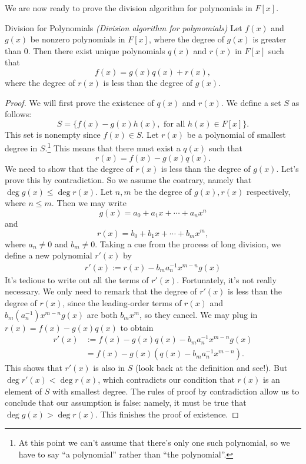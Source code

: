 We are now ready to prove the division algorithm for polynomials in $F[x]$.

\begin{prop} {Division for Polynomials} \emph{(Division algorithm for polynomials)}
Let $f(x)$ and $g(x)$ be nonzero polynomials in $F[x]$, where the degree of $g(x)$ is greater than 0.  Then there exist unique polynomials $q(x)$ and $r(x)$ in $F[x]$ such that 
\[
f(x) = g(x)q(x) + r(x),
\]
where the degree of $r(x)$ is less than the degree of $g(x)$.
\end {prop}

\begin{proof}
We will first prove the existence of $q(x)$ and $r(x)$. We define a set $S$ as follows: 
\[S = \{f(x) - g(x) h(x), \text{ for all } h(x) \in F[x] \}.\] 
 This set is nonempty since $f(x) \in
S$. 
Let
$r(x)$ be  a polynomial of smallest degree in $S$.\footnote{At this point we can't assume that there's only one such polynomial, so we have to say ``a polynomial'' rather than ``the polynomial''.} This means that there must exist a $q(x)$ such that  
\[
r(x) = f(x) - g(x) q(x).
\]
We need to show that the degree of $r(x)$ is less than the degree of
$g(x)$. Let's prove this by contradiction. So we assume the contrary, namely  that $\deg g(x) \leq \deg r(x)$. 
Let $n,m$ be the degree of $g(x),r(x)$ respectively, where $n \leq m$. Then we may write
\[
g(x) = a_0 + a_1 x + \cdots + a_n x^n
\]
and
\[
r(x) = b_0 + b_1 
x + \cdots + b_m x^m, \]
where $a_n \neq 0$ and $b_m \neq 0$. 
Taking a cue from the process of long division, we define a new polynomial $r'(x)$ by
\begin{align*}
r'(x) := r(x) - b_m a_n^{-1} x^{m-n}g(x)
\end{align*}
It's tedious to write out all the terms of $r'(x)$. Fortunately, it's not really necessary. We only need to remark that the degree of $r'(x)$ is less than the degree of $r(x)$, since the leading-order terms of $r(x)$ and $b_m(a_n^{-1}) x^{m-n}g(x)$ are both $b_m x^m$, so they cancel. We may plug in $r(x) = f(x) - g(x) q(x)$ to obtain
\begin{align*}
r'(x) &:=  f(x) - g(x) q(x) - b_m a_n^{-1}  x^{m-n}g(x)\\
&= f(x) - g(x) \left( q(x) - b_m a_n^{-1}  x^{m-n}\right).
\end{align*}
This shows that $r'(x)$ is also in $S$  (look back at the definition and see!).  But 
$\deg r'(x) < \deg r(x)$, which contradicts our condition that $r(x)$ is an element of $S$ with smallest degree. The rules of proof by contradiction allow us to conclude that our assumption is false: namely, it must be true that $\deg g(x) > \deg r(x)$.
This finishes the proof of existence.


\end{proof}
